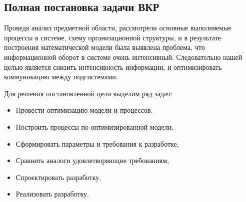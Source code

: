 \subsection{Полная постановка задачи ВКР}
Проведя анализ предметной области, рассмотрели основные выполняемые процессы в системе, схему организационной структуры, и в результате построения математической модели была выявлена проблема, что информационной оборот в системе очень интенсивный. Следовательно нашей целью является снизить интенсивность информации, и оптимизировать коммуникацию между подсистемами.

Для решения постановленной цели выделим ряд задач:
\begin{itemize}
	\item Провести оптимизацию модели и процессов,
	\item Построить процессы по оптимизированной модели,
	\item Сформировать параметры и требования к разработке,
	\item Сравнить аналоги удовлетворяющие требованиям,
	\item Спроектировать разработку,
	\item Реализовать разработку.
\end{itemize}
\pagebreak